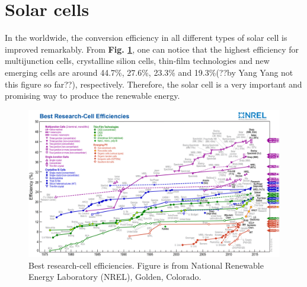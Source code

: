 \documentclass[a4paper, 12pt, titlepage,oneside,drop]{kthesis}
\begin{document}
\section{Solar cells}
In the worldwide, the conversion efficiency in all different types of solar cell is improved remarkably. From \textbf{Fig. \ref{nrel}}, one can notice that the highest efficiency for multijunction cells, crystalline silion cells,
thin-film technologies and new emerging cells are around 44.7\%, 27.6\%, 23.3\% and 19.3\%(??by Yang Yang not this figure so far??), respectively. Therefore, the solar cell is a very important and promising way to produce the
renewable energy.

\begin{figure}
\centering
\includegraphics[scale=0.7]{efficiency_chart.jpg}
\caption{Best research-cell efficiencies. Figure is from National Renewable Energy Laboratory (NREL), Golden, Colorado.}
\label{nrel}
\end{figure}
\end{document}
